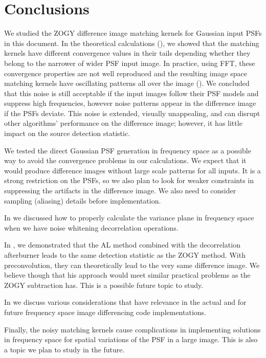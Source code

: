 \section{Conclusions}
%
\par We studied the ZOGY difference image matching kernels for Gaussian
input PSFs in this document. In the theoretical calculations
(), we showed that the matching kernels have different
convergence values in their tails depending whether they belong to the
narrower of wider PSF input image. In practice, using FFT, these convergence
properties are not well reproduced and the resulting image space matching
kernels have oscillating patterns all over the image
(). We concluded that this noise is still acceptable if
the input images follow their PSF models and suppress high frequencies,
however noise patterns appear in the difference image if the PSFs
deviate. This noise is extended, visually unappealing, and can disrupt other
algorithms' performance on the difference image; however, it has little
impact on the source detection statistic.
%
\par We tested the direct Gaussian PSF generation in frequency space as a
possible way to avoid the convergence problems in our calculations. We
expect that it would produce difference images without large scale patterns
for all inputs. It is a strong restriction on the PSFs, so we also plan to
look for weaker constraints in suppressing the artifacts in the difference
image. We also need to consider sampling (aliasing) details before
implementation.
%
\par In  we discussed how to properly calculate the variance
plane in frequency space when we have noise whitening decorrelation
operations.
%
\par In , we demonstrated that the AL method combined with
the decorrelation afterburner leads to the same detection statistic as the
ZOGY method. With preconvolution, they can theoretically lead to the very
same difference image. We believe though that his approach would meet
similar practical problems as the ZOGY subtraction has. This is a possible
future topic to study.
%
\par In  we discuss various considerations that have
relevance in the actual and for future frequency space image differencing
code implementations.
%
\par Finally, the noisy matching kernels cause complications in
implementing solutions in frequency space for spatial variations of the PSF
in a large image. This is also a topic we plan to study in the future.

